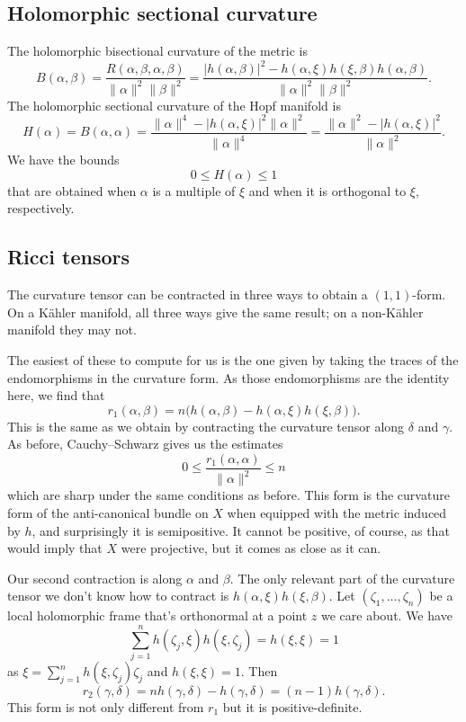 \documentclass[11pt]{article}
\theoremstyle{definition}
\begin{document}
\subsection{Holomorphic sectional curvature}
\label{sec:org6471503}

The holomorphic bisectional curvature of the metric is
$$
B(\alpha,\beta)
= \frac{R(\alpha,\beta,\alpha,\beta)}{\|\alpha\|^2\|\beta\|^2}
= \frac{|h(\alpha,\beta)|^2 - h(\alpha,\xi)h(\xi,\beta)h(\alpha,\beta)}{\|\alpha\|^2\|\beta\|^2}.
$$
The holomorphic sectional curvature of the Hopf manifold is
$$
H(\alpha)
= B(\alpha,\alpha)
= \frac{\|\alpha\|^4 - |h(\alpha,\xi)|^2 \|\alpha\|^2}{\|\alpha\|^4}
= \frac{\|\alpha\|^2 - |h(\alpha,\xi)|^2}{\|\alpha\|^2}.
$$
We have the bounds
$$
0 \leq H(\alpha) \leq 1
$$
that are obtained when $\alpha$ is a multiple of $\xi$ and when it is orthogonal to $\xi$, respectively.

\subsection{Ricci tensors}
\label{sec:org3942125}

The curvature tensor can be contracted in three ways to obtain a \((1,1)\)-form. On a K\"ahler manifold, all three ways give the same result; on a non-K\"ahler manifold they may not.

The easiest of these to compute for us is the one given by taking the traces of the endomorphisms in the curvature form. As those endomorphisms are the identity here, we find that
$$
r_1(\alpha, \beta)
= n \bigl( h(\alpha, \beta) - h(\alpha, \xi) h(\xi, \beta) \bigr).
$$
This is the same as we obtain by contracting the curvature tensor along \(\delta\) and \(\gamma\). As before, Cauchy--Schwarz gives us the estimates
$$
0
\leq \frac{r_1(\alpha, \alpha)}{\|\alpha\|^2}
\leq n
$$
which are sharp under the same conditions as before. This form is the curvature form of the anti-canonical bundle on $X$ when equipped with the metric induced by $h$, and surprisingly it is semipositive. It cannot be positive, of course, as that would imply that $X$ were projective, but it comes as close as it can.

Our second contraction is along \(\alpha\) and \(\beta\). The only relevant part of the curvature tensor we don't know how to contract is \(h(\alpha, \xi)h(\xi, \beta)\). Let \((\zeta_1, \ldots, \zeta_n)\) be a local holomorphic frame that's orthonormal at a point \(z\) we care about. We have
$$
\sum_{j=1}^n h(\zeta_j, \xi) h(\xi, \zeta_j) = h(\xi, \xi) = 1
$$
as \(\xi = \sum_{j=1}^n h(\xi, \zeta_j) \zeta_j\) and \(h(\xi,\xi) = 1\).
Then
$$
r_2(\gamma, \delta)
= n h(\gamma, \delta) - h(\gamma, \delta)
= (n-1) h(\gamma, \delta).
$$
This form is not only different from \(r_1\) but it is positive-definite.
\end{document}
